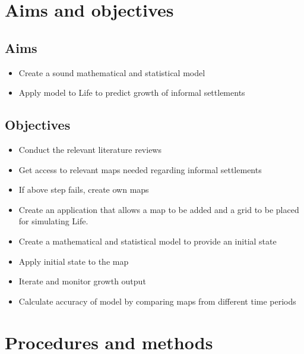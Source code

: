 \section{Aims and objectives}
\subsection{Aims}
\begin{itemize}
\item Create a sound mathematical and statistical model
\item Apply model to Life to predict growth of informal settlements
\end{itemize}
\subsection{Objectives}
\begin{itemize}
\item Conduct the relevant literature reviews
\item Get access to relevant maps needed regarding informal settlements
\item If above step fails, create own maps
\item Create an application that allows a map to be added and a grid to be placed for simulating Life.
\item Create a mathematical and statistical model to provide an initial state
\item Apply initial state to the map
\item Iterate and monitor growth output
\item Calculate accuracy of model by comparing maps from different time periods
\end{itemize}
\section{Procedures and methods}

